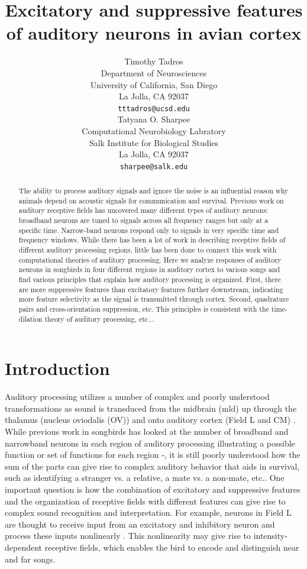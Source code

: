\documentclass{article}
\title{Excitatory and suppressive features of auditory neurons in avian cortex}
\author{
  Timothy Tadros\\
  Department of Neurosciences\\
  University of California, San Diego\\
  La Jolla, CA 92037 \\
  \texttt{tttadros@ucsd.edu} \\
  \And
  Tatyana O. Sharpee\\
  Computational Neurobiology Labratory\\
  Salk Institute for Biological Studies\\
  La Jolla, CA 92037\\
  \texttt{sharpee@salk.edu}\\
}
\begin{document}

\maketitle

\begin{abstract}
  The ability to process auditory signals and ignore the noise is an influential reason why animals depend on acoustic signals for communication and survival. Previous work on auditory receptive fields has uncovered many different types of auditory neurons: broadband neurons are tuned to signals across all frequency ranges but only at a specific time. Narrow-band neurons respond only to signals in very specific time and frequency windows. While there has been a lot of work in describing receptive fields of different auditory processing regions, little has been done to connect this work with computational theories of auditory processing. Here we analyze responses of auditory neurons in songbirds in four different regions in auditory cortex to various songs and find various principles that explain how auditory processing is organized. First, there are more suppressive features than excitatory features further downstream, indicating more feature selectivity as the signal is transmitted through cortex. Second, quadrature pairs and cross-orientation suppression, etc. This principles is consistent with the time-dilation theory of auditory processing, etc...
\end{abstract}

\section{Introduction}

Auditory processing utilizes a number of complex and poorly understood transformations as sound is transduced from the midbrain (mld) up through the thalamus (nucleus oviodalis (OV)) and onto auditory cortex (Field L and CM) \cite{ondracek2013advances}. While previous work in songbirds has looked at the number of broadband and narrowband neurons in each region of auditory processing illustrating a possible function or set of functions for each region \cite{woolley2009functional}-\cite{amin2010role}, it is still poorly understood how the sum of the parts can give rise to complex auditory behavior that aids in survival, such as identifying a stranger vs. a relative, a mate vs. a non-mate, etc.. One important question is how the combination of excitatory and suppressive features and the organization of receptive fields with different features can give rise to complex sound recognition and interpretation. For example, neurons in Field L are thought to receive input from an excitatory and inhibitory neuron and process these inputs nonlinearly \cite{nagel2008organizing}. This nonlinearity may give rise to intensity-dependent receptive fields, which enables the bird to encode and distinguish near and far songs.
\end{document}

